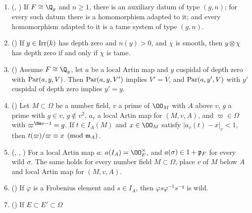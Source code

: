 \begin{enumerate}[label=(F\arabic*),leftmargin=3em]
  $(g,n)$ with values in $K^\times$, $\theta$ a regular character of $K^\times$ and $V\in\llcWD_A$ of inertial
  form $(R,\theta)$. Then $V$ has inertial form $(R,\theta^{g^j})$ for every $j\ge0$; if $V$ has inertial form
  $(R,\theta')$ then $\theta'=\theta^{g^j}$ for some $j<n$; and if $V$, $V'$ are irreducible and tame, $V'$ has
  inertial form $(R,\theta)$ and $\det_\sigma V=\det_\sigma V'$ for all $\sigma$, then $V'=V$.
\item\label{pf:llc:F-extex} (,
  ) If $F\cong\Q_g$ and $n\ge1$, there is an auxiliary datum of
  type $(g,n)$; for every such datum there is a homomorphism adapted to it; and every homomorphism adapted
  to it is a tame system of type $(g,n)$.
\item\label{pf:llc:F-twtame} () If $y\in\operatorname{Irr}(k)$ has depth zero
  and $n(y)>0$, and $\chi$ is smooth, then $y\otimes\chi$ has depth zero if and only if $\chi$ is tame.
\item\label{pf:llc:F-paruniq} () Assume $F\cong\Q_g$, let $a$ be a
  local Artin map and $y$ cuspidal of depth zero with $\operatorname{Par}(a,y,V)$. Then $\operatorname{Par}(a,y,V')$ implies
  $V'=V$, and $\operatorname{Par}(a,y',V)$ with $y'$ cuspidal of depth zero implies $y'=y$.
\item\label{pf:llc:F-tamerec} () Let $M\subset\Omega$ be a number
  field, $v$ a prime of $\OO_M$ with $A$ above $v$, $g$ a prime with $g\in v$, $g\notin v^2$, $a_v$ a local
  Artin map for $(M,v,A)$, and $\varpi\in\Omega$ with $\varpi^{\Nm v-1}=g$. If $t\in I_A(M)$ and $x\in\OO_M$
  satisfy $|a_v(t)-x|_v<1$, then $t(\varpi)/\varpi\equiv x\pmod{\mathfrak m_A}$.
\item\label{pf:llc:F-artine} (,
  ,
  ) For a local Artin map $a$:
  $a(I_A)=\OO_F^\times$, and $a(\sigma)\in1+\mathfrak p_F$ for every wild $\sigma$. The same holds for every number
  field $M\subset\Omega$, place $v$ of $M$ below $A$ and local Artin map for $(M,v,A)$.
\item\label{pf:llc:F-wildfrob} () If $\varphi$ is a
  Frobenius element and $s\in I_A$, then $\varphi s\varphi^{-1}s^{-q}$ is wild.
\item\label{pf:llc:F-inelift} () If $E\subset E'\subset\Omega$

\end{enumerate}
